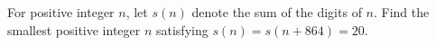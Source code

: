 For positive integer $n$, let $s(n)$ denote the sum of the digits of $n$. Find the smallest positive integer $n$ satisfying $s(n)=s(n+864)=20$.